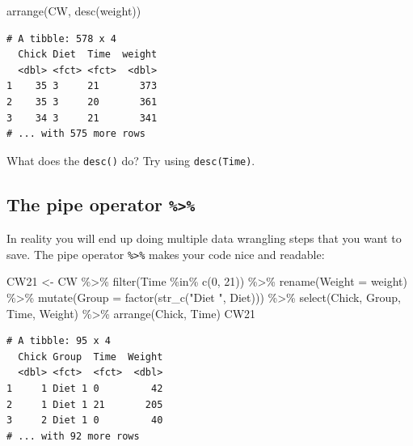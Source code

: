 \documentclass[
  letterpaper,
  DIV=11,
  numbers=noendperiod]{scrreprt}
\newenvironment{Shaded}{\begin{snugshade}}{\end{snugshade}}
\newcommand{\AttributeTok}[1]{\textcolor[rgb]{0.40,0.45,0.13}{#1}}
\newcommand{\DecValTok}[1]{\textcolor[rgb]{0.68,0.00,0.00}{#1}}
\newcommand{\FunctionTok}[1]{\textcolor[rgb]{0.28,0.35,0.67}{#1}}
\newcommand{\NormalTok}[1]{\textcolor[rgb]{0.00,0.23,0.31}{#1}}
\newcommand{\OtherTok}[1]{\textcolor[rgb]{0.00,0.23,0.31}{#1}}
\newcommand{\SpecialCharTok}[1]{\textcolor[rgb]{0.37,0.37,0.37}{#1}}
\newcommand{\StringTok}[1]{\textcolor[rgb]{0.13,0.47,0.30}{#1}}
\theoremstyle{definition}
\theoremstyle{plain}
\theoremstyle{plain}
\theoremstyle{remark}
\begin{document}
\begin{Shaded}
\begin{Highlighting}[]
\FunctionTok{arrange}\NormalTok{(CW, }\FunctionTok{desc}\NormalTok{(weight))}
\end{Highlighting}
\end{Shaded}

\begin{verbatim}
# A tibble: 578 x 4
  Chick Diet  Time  weight
  <dbl> <fct> <fct>  <dbl>
1    35 3     21       373
2    35 3     20       361
3    34 3     21       341
# ... with 575 more rows
\end{verbatim}

What does the \texttt{desc()} do? Try using \texttt{desc(Time)}.

\hypertarget{the-pipe-operator}{%
\subsection{\texorpdfstring{The pipe operator
\texttt{\%\textgreater{}\%}}{The pipe operator \%\textgreater\%}}\label{the-pipe-operator}}

In reality you will end up doing multiple data wrangling steps that you
want to save. The pipe operator \texttt{\%\textgreater{}\%} makes your
code nice and readable:

\begin{Shaded}
\begin{Highlighting}[]
\NormalTok{CW21 }\OtherTok{\textless{}{-}}\NormalTok{ CW }\SpecialCharTok{\%\textgreater{}\%} 
  \FunctionTok{filter}\NormalTok{(Time }\SpecialCharTok{\%in\%} \FunctionTok{c}\NormalTok{(}\DecValTok{0}\NormalTok{, }\DecValTok{21}\NormalTok{)) }\SpecialCharTok{\%\textgreater{}\%} 
  \FunctionTok{rename}\NormalTok{(}\AttributeTok{Weight =}\NormalTok{ weight) }\SpecialCharTok{\%\textgreater{}\%} 
  \FunctionTok{mutate}\NormalTok{(}\AttributeTok{Group =} \FunctionTok{factor}\NormalTok{(}\FunctionTok{str\_c}\NormalTok{(}\StringTok{"Diet "}\NormalTok{, Diet))) }\SpecialCharTok{\%\textgreater{}\%} 
  \FunctionTok{select}\NormalTok{(Chick, Group, Time, Weight) }\SpecialCharTok{\%\textgreater{}\%} 
  \FunctionTok{arrange}\NormalTok{(Chick, Time) }
\NormalTok{CW21}
\end{Highlighting}
\end{Shaded}

\begin{verbatim}
# A tibble: 95 x 4
  Chick Group  Time  Weight
  <dbl> <fct>  <fct>  <dbl>
1     1 Diet 1 0         42
2     1 Diet 1 21       205
3     2 Diet 1 0         40
# ... with 92 more rows
\end{verbatim}
\end{document}
